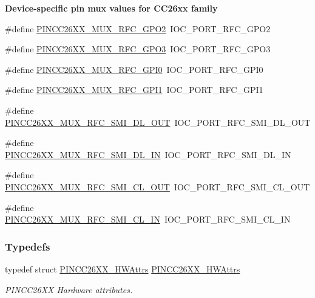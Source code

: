 \begin{Indent}{\bf Device-\/specific pin mux values for C\+C26xx family}
\begin{DoxyCompactItemize}
\item 
\#define \hyperlink{_p_i_n_c_c26_x_x_8h_a144116dadf2ba363c54c7d2507abe54e}{P\+I\+N\+C\+C26\+X\+X\+\_\+\+M\+U\+X\+\_\+\+R\+F\+C\+\_\+\+G\+P\+O2}~I\+O\+C\+\_\+\+P\+O\+R\+T\+\_\+\+R\+F\+C\+\_\+\+G\+P\+O2
\item 
\#define \hyperlink{_p_i_n_c_c26_x_x_8h_adc5890a2a1333e956349ed23bbe49d10}{P\+I\+N\+C\+C26\+X\+X\+\_\+\+M\+U\+X\+\_\+\+R\+F\+C\+\_\+\+G\+P\+O3}~I\+O\+C\+\_\+\+P\+O\+R\+T\+\_\+\+R\+F\+C\+\_\+\+G\+P\+O3
\item 
\#define \hyperlink{_p_i_n_c_c26_x_x_8h_acb09fb065bb0d5951baa8a6441471854}{P\+I\+N\+C\+C26\+X\+X\+\_\+\+M\+U\+X\+\_\+\+R\+F\+C\+\_\+\+G\+P\+I0}~I\+O\+C\+\_\+\+P\+O\+R\+T\+\_\+\+R\+F\+C\+\_\+\+G\+P\+I0
\item 
\#define \hyperlink{_p_i_n_c_c26_x_x_8h_a71f92d2ec8410256434ce0968476a749}{P\+I\+N\+C\+C26\+X\+X\+\_\+\+M\+U\+X\+\_\+\+R\+F\+C\+\_\+\+G\+P\+I1}~I\+O\+C\+\_\+\+P\+O\+R\+T\+\_\+\+R\+F\+C\+\_\+\+G\+P\+I1
\item 
\#define \hyperlink{_p_i_n_c_c26_x_x_8h_ad92f4bc3d98cd1363bac0beb6238c7c2}{P\+I\+N\+C\+C26\+X\+X\+\_\+\+M\+U\+X\+\_\+\+R\+F\+C\+\_\+\+S\+M\+I\+\_\+\+D\+L\+\_\+\+O\+U\+T}~I\+O\+C\+\_\+\+P\+O\+R\+T\+\_\+\+R\+F\+C\+\_\+\+S\+M\+I\+\_\+\+D\+L\+\_\+\+O\+U\+T
\item 
\#define \hyperlink{_p_i_n_c_c26_x_x_8h_abb958dd1da8d7fab19495a9d70cfc2cb}{P\+I\+N\+C\+C26\+X\+X\+\_\+\+M\+U\+X\+\_\+\+R\+F\+C\+\_\+\+S\+M\+I\+\_\+\+D\+L\+\_\+\+I\+N}~I\+O\+C\+\_\+\+P\+O\+R\+T\+\_\+\+R\+F\+C\+\_\+\+S\+M\+I\+\_\+\+D\+L\+\_\+\+I\+N
\item 
\#define \hyperlink{_p_i_n_c_c26_x_x_8h_a23575044cc0b9a4ce8b680339672f024}{P\+I\+N\+C\+C26\+X\+X\+\_\+\+M\+U\+X\+\_\+\+R\+F\+C\+\_\+\+S\+M\+I\+\_\+\+C\+L\+\_\+\+O\+U\+T}~I\+O\+C\+\_\+\+P\+O\+R\+T\+\_\+\+R\+F\+C\+\_\+\+S\+M\+I\+\_\+\+C\+L\+\_\+\+O\+U\+T
\item 
\#define \hyperlink{_p_i_n_c_c26_x_x_8h_af897af5e1ed1dff451e4ae505eea3f2d}{P\+I\+N\+C\+C26\+X\+X\+\_\+\+M\+U\+X\+\_\+\+R\+F\+C\+\_\+\+S\+M\+I\+\_\+\+C\+L\+\_\+\+I\+N}~I\+O\+C\+\_\+\+P\+O\+R\+T\+\_\+\+R\+F\+C\+\_\+\+S\+M\+I\+\_\+\+C\+L\+\_\+\+I\+N
\end{DoxyCompactItemize}
\end{Indent}
\subsubsection*{Typedefs}
\begin{DoxyCompactItemize}
\item 
typedef struct \hyperlink{struct_p_i_n_c_c26_x_x___h_w_attrs}{P\+I\+N\+C\+C26\+X\+X\+\_\+\+H\+W\+Attrs} \hyperlink{_p_i_n_c_c26_x_x_8h_ab5e14c623ee19df328043d474fa8e0d9}{P\+I\+N\+C\+C26\+X\+X\+\_\+\+H\+W\+Attrs}
\begin{DoxyCompactList}\small\item\em P\+I\+N\+C\+C26\+X\+X Hardware attributes. \end{DoxyCompactList}\end{DoxyCompactItemize}

